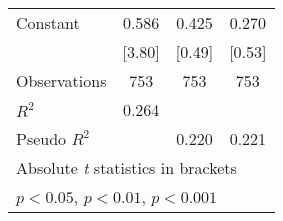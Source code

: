 \begin{table}[htbp]
\begin{tabular}{l*{3}{c}}
Constant            &       0.586\sym{***}&       0.425         &       0.270         \\
                    &      [3.80]         &      [0.49]         &      [0.53]         \\
\hline
Observations        &         753         &         753         &         753         \\
\(R^{2}\)           &       0.264         &                     &                     \\
Pseudo \(R^{2}\)    &                     &       0.220         &       0.221         \\
\hline\hline
\multicolumn{4}{l}{\footnotesize Absolute \textit{t} statistics in brackets}\\
\multicolumn{4}{l}{\footnotesize \sym{*} \(p<0.05\), \sym{**} \(p<0.01\), \sym{***} \(p<0.001\)}\\
\end{tabular}
\end{table}
